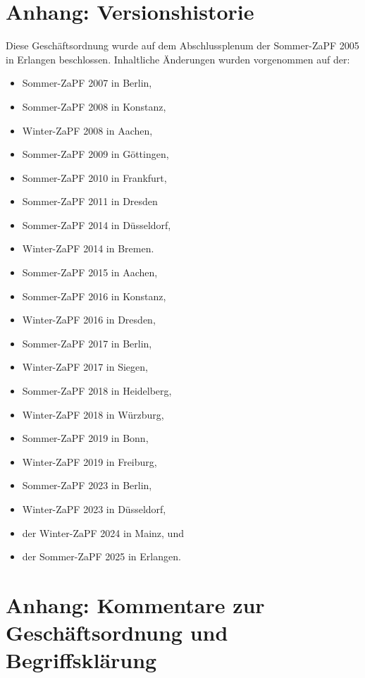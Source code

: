 \documentclass[
  a4paper,
  oneside]{scrartcl}
\providecommand{\tightlist}{%
  \setlength{\itemsep}{0pt}\setlength{\parskip}{0pt}}
\begin{document}
\section*{Anhang: Versionshistorie}\label{anhang-versionshistorie}

Diese Geschäftsordnung wurde auf dem Abschlussplenum der Sommer-ZaPF
2005 in Erlangen beschlossen. Inhaltliche Änderungen wurden vorgenommen
auf der:

\begin{itemize}
\tightlist
\item
  Sommer-ZaPF 2007 in Berlin,
\item
  Sommer-ZaPF 2008 in Konstanz,
\item
  Winter-ZaPF 2008 in Aachen,
\item
  Sommer-ZaPF 2009 in Göttingen,
\item
  Sommer-ZaPF 2010 in Frankfurt,
\item
  Sommer-ZaPF 2011 in Dresden
\item
  Sommer-ZaPF 2014 in Düsseldorf,
\item
  Winter-ZaPF 2014 in Bremen.
\item
  Sommer-ZaPF 2015 in Aachen,
\item
  Sommer-ZaPF 2016 in Konstanz,
\item
  Winter-ZaPF 2016 in Dresden,
\item
  Sommer-ZaPF 2017 in Berlin,
\item
  Winter-ZaPF 2017 in Siegen,
\item
  Sommer-ZaPF 2018 in Heidelberg,
\item
  Winter-ZaPF 2018 in Würzburg,
\item
  Sommer-ZaPF 2019 in Bonn,
\item
  Winter-ZaPF 2019 in Freiburg,
\item
  Sommer-ZaPF 2023 in Berlin,
\item
  Winter-ZaPF 2023 in Düsseldorf,
\item
  der Winter-ZaPF 2024 in Mainz, und
\item
  der Sommer-ZaPF 2025 in Erlangen.
\end{itemize}

\section*{Anhang: Kommentare zur Geschäftsordnung und
Begriffsklärung}\label{anhang-kommentare-zur-geschuxe4ftsordnung-und-begriffskluxe4rung}
\end{document}
